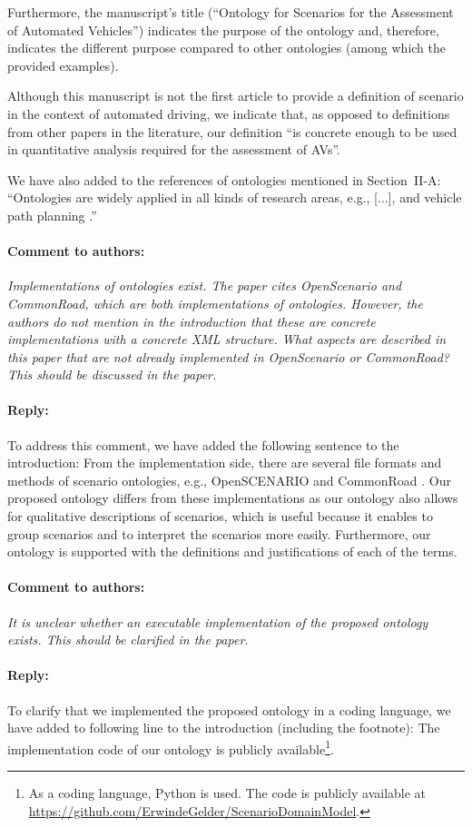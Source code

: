 \documentclass[10pt,final,a4paper,oneside,onecolumn]{article}
\newcommand{\toauthor}{\paragraph*{Comment to authors:} \itshape}
\newcommand{\fromauthor}{\paragraph*{Reply:} \normalfont}
\newcommand{\cstart}{\cbstart\color{red}}
\newcommand{\cend}{\cbend\color{black}}
\begin{document}
Furthermore, the manuscript's title (``Ontology for Scenarios for the Assessment of Automated Vehicles'') indicates the purpose of the ontology and, therefore, indicates the different purpose compared to other ontologies (among which the provided examples).

Although this manuscript is not the first article to provide a definition of scenario in the context of automated driving, we indicate that, as opposed to definitions from other papers in the literature, our definition ``is concrete enough to be used in quantitative analysis required for the assessment of AVs''.

We have also added \textcite{provine2004ontology, schlenoff2003using} to the references of ontologies mentioned in Section~II-A: ``Ontologies are widely applied in all kinds of research areas, e.g., [...], \cstart and vehicle path planning \autocite{provine2004ontology, schlenoff2003using}.\cend''



\toauthor Implementations of ontologies exist. The paper cites OpenScenario and CommonRoad, which are both implementations of ontologies. However, the authors do not mention in the introduction that these are concrete implementations with a concrete XML structure. What aspects are described in this paper that are not already implemented in OpenScenario or CommonRoad? This should be discussed in the paper. 

\fromauthor To address this comment, we have added the following sentence to the introduction: \cstart From the implementation side, there are several file formats and methods of scenario ontologies, e.g., OpenSCENARIO \autocite{openscenario} and CommonRoad \autocite{althoff2017CommonRoad}. Our proposed ontology differs from these implementations as our ontology also allows for qualitative descriptions of scenarios, which is useful because it enables to group scenarios and to interpret the scenarios more easily.
Furthermore, our ontology is supported with the definitions and justifications of each of the terms.\cend



\toauthor It is unclear whether an executable implementation of the proposed ontology exists. This should be clarified in the paper.

\fromauthor To clarify that we implemented the proposed ontology in a coding language, we have added to following line to the introduction (including the footnote): \cstart The implementation code of our ontology is publicly available\footnote{\cstart As a coding language, Python is used. The code is publicly available at \url{https://github.com/ErwindeGelder/ScenarioDomainModel}.\cend}\cend.
\end{document}

